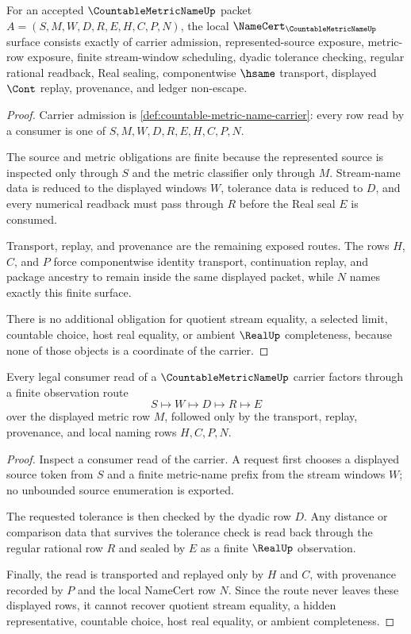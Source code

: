 \begin{theorem}
\label{thm:countable-metric-name-namecert-obligation-surface}
For an accepted $\CountableMetricNameUp$ packet $A=(S,M,W,D,R,E,H,C,P,N)$, the local $\NameCert_{\CountableMetricNameUp}$ surface consists exactly of carrier admission, represented-source exposure, metric-row exposure, finite stream-window scheduling, dyadic tolerance checking, regular rational readback, Real sealing, componentwise $\hsame$ transport, displayed $\Cont$ replay, provenance, and ledger non-escape.
\end{theorem}
\begin{proof}
Carrier admission is \autoref{def:countable-metric-name-carrier}: every row read by a consumer is one of $S,M,W,D,R,E,H,C,P,N$.

The source and metric obligations are finite because the represented source is inspected only through $S$ and the metric classifier only through $M$. Stream-name data is reduced to the displayed windows $W$, tolerance data is reduced to $D$, and every numerical readback must pass through $R$ before the Real seal $E$ is consumed.

Transport, replay, and provenance are the remaining exposed routes. The rows $H$, $C$, and $P$ force componentwise identity transport, continuation replay, and package ancestry to remain inside the same displayed packet, while $N$ names exactly this finite surface.

There is no additional obligation for quotient stream equality, a selected limit, countable choice, host real equality, or ambient $\RealUp$ completeness, because none of those objects is a coordinate of the carrier.
\end{proof}

\begin{theorem}
\label{thm:countable-metric-name-finite-observation-scope}
Every legal consumer read of a $\CountableMetricNameUp$ carrier factors through a finite observation route
$$
S\longmapsto W\longmapsto D\longmapsto R\longmapsto E
$$
over the displayed metric row $M$, followed only by the transport, replay, provenance, and local naming rows $H,C,P,N$.
\end{theorem}
\begin{proof}
Inspect a consumer read of the carrier. A request first chooses a displayed source token from $S$ and a finite metric-name prefix from the stream windows $W$; no unbounded source enumeration is exported.

The requested tolerance is then checked by the dyadic row $D$. Any distance or comparison data that survives the tolerance check is read back through the regular rational row $R$ and sealed by $E$ as a finite $\RealUp$ observation.

Finally, the read is transported and replayed only by $H$ and $C$, with provenance recorded by $P$ and the local NameCert row $N$. Since the route never leaves these displayed rows, it cannot recover quotient stream equality, a hidden representative, countable choice, host real equality, or ambient completeness.
\end{proof}

